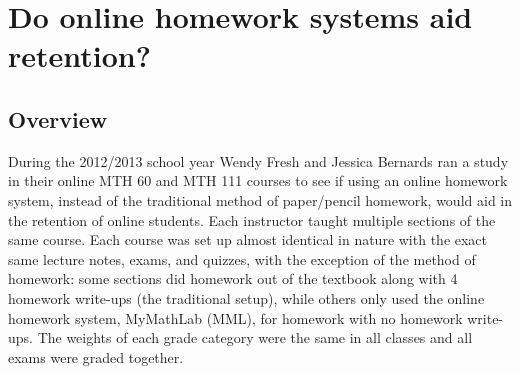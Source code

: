 \chapter{Do online homework systems aid retention?}
\label{app:sec:onlinehwstudy}

\section{Overview}
During the 2012/2013 school year Wendy Fresh and Jessica Bernards ran a study
in their online MTH 60 and MTH 111 courses to see if using an online homework
system, instead of the traditional method of paper/pencil homework, would aid
in the retention of online students.  Each instructor taught multiple sections
of the same course.  Each course was set up almost identical in nature with the
exact same lecture notes, exams, and quizzes, with the exception of the method
of homework: some sections did homework out of the textbook along with 4
homework write-ups (the traditional setup), while others only used the online
homework system, MyMathLab (MML), for homework with no homework write-ups.  The
weights of each grade category were the same in all classes and all exams were
graded together.

